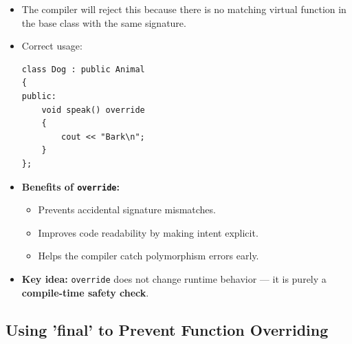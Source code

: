 \documentclass[10pt]{article}
\begin{document}
\begin{itemize}
	\item The compiler will reject this because there is no matching virtual function in the base class with the same signature.

	\item Correct usage:

\begin{verbatim}
class Dog : public Animal
{
public:
    void speak() override
    {
        cout << "Bark\n";
    }
};
\end{verbatim}

	\item \textbf{Benefits of \texttt{override}:}
	\begin{itemize}
		\item Prevents accidental signature mismatches.
		\item Improves code readability by making intent explicit.
		\item Helps the compiler catch polymorphism errors early.
	\end{itemize}

	\item \textbf{Key idea:} \texttt{override} does not change runtime behavior — it is purely a \textbf{compile-time safety check}.
\end{itemize}

\newpage
\subsection{Using 'final' to Prevent Function Overriding}
\end{document}
